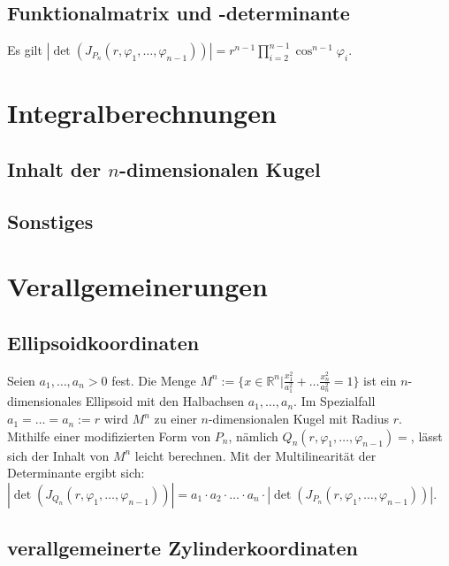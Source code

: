\documentclass[a4paper,11pt]{report}
\theoremstyle{definition}
\newcommand{\R}{{\ensuremath{\mathbb{R}}}}
\begin{document}
\section{Funktionalmatrix und -determinante}
Es gilt $|\det(J_{P_n}(r,\varphi_1,\ldots,\varphi_{n-1}))|=r^{n-1}\prod\limits_{i=2}^{n-1}\cos^{n-1}\varphi_i$.
\chapter{Integralberechnungen}
\section{Inhalt der $n$-dimensionalen Kugel}
\section{Sonstiges}%
\chapter{Verallgemeinerungen}
\section{\glqq Ellipsoidkoordinaten\grqq}%
Seien $a_1,\ldots,a_n>0$ fest. Die Menge $M^n:=\{x\in\R^n|\frac{x_1^2}{a_1^2}+\ldots\frac{x_n^2}{a_n^2}=1\}$ ist ein $n$-dimensionales Ellipsoid mit den Halbachsen $a_1,\ldots,a_n$. Im Spezialfall $a_1=\ldots=a_n:=r$ wird $M^n$ zu einer $n$-dimensionalen Kugel mit Radius $r$.\\
Mithilfe einer modifizierten Form von $P_n$, nämlich $Q_n(r,\varphi_1,\ldots,\varphi_{n-1})=$, %
lässt sich der Inhalt von $M^n$ leicht berechnen. Mit der Multilinearität der Determinante ergibt sich:\\
$|\det(J_{Q_n}(r,\varphi_1,\ldots,\varphi_{n-1}))|=
a_1\cdot a_2\cdot\ldots\cdot a_n\cdot|\det(J_{P_n}(r,\varphi_1,\ldots,\varphi_{n-1}))|$.
\section{verallgemeinerte Zylinderkoordinaten}
\end{document}
